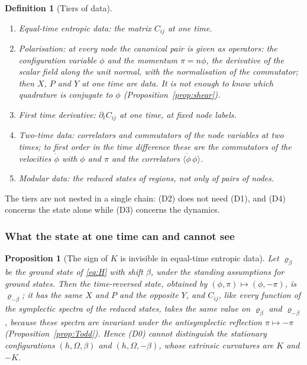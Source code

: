 \documentclass[11pt,a4paper]{article}
\theoremstyle{stmt}
\newtheorem{proposition}[theorem]{Proposition}
\theoremstyle{defn}
\newtheorem{definition}[theorem]{Definition}
\theoremstyle{rmk}
\numberwithin{equation}{section}
\begin{document}
{\begin{definition}[Tiers of data]\label{def:tiers}
\begin{enumerate}[label=\textup{(D\arabic*)},start=0]
\item \emph{Equal-time entropic data:} the matrix $C_{ij}$ at one time.
\item \emph{Polarisation:} at every node the canonical pair is given \emph{as operators}: the configuration variable $\phi$ and the momentum $\pi=n\phi$, the derivative of the scalar field along the unit normal, with the normalisation of the commutator; then $X$, $P$ and $Y$ at one time are data. It is not enough to know which quadrature is conjugate to $\phi$ (Proposition~\ref{prop:shear}).
\item \emph{First time derivative:} $\partial_tC_{ij}$ at one time, at fixed node labels.
\item \emph{Two-time data:} correlators and commutators of the node variables at two times; to first order in the time difference these are the commutators of the velocities $\dot\phi$ with $\phi$ and $\pi$ and the correlators $\langle\dot\phi\,\phi\rangle$.
\item \emph{Modular data:} the reduced states of regions, not only of pairs of nodes.
\end{enumerate}
\end{definition}

The tiers are not nested in a single chain: (D2) does not need (D1), and (D4) concerns the state alone while (D3) concerns the dynamics.

\subsubsection{What the state at one time can and cannot see}

\begin{proposition}[The sign of $K$ is invisible in equal-time entropic data]\label{prop:sign}
Let $\varrho_\beta$ be the ground state of \eqref{eq:H} with shift $\beta$, under the standing assumptions for ground states. Then the time-reversed state, obtained by $(\phi,\pi)\mapsto(\phi,-\pi)$, is $\varrho_{-\beta}$; it has the same $X$ and $P$ and the opposite $Y$, and $C_{ij}$, like every function of the symplectic spectra of the reduced states, takes the same value on $\varrho_\beta$ and $\varrho_{-\beta}$, because these spectra are invariant under the antisymplectic reflection $\pi\mapsto-\pi$ (Proposition~\ref{prop:Todd}). Hence \textup{(D0)} cannot distinguish the stationary configurations $(h,\Omega,\beta)$ and $(h,\Omega,-\beta)$, whose extrinsic curvatures are $K$ and $-K$.
\end{proposition}

}
\end{document}
